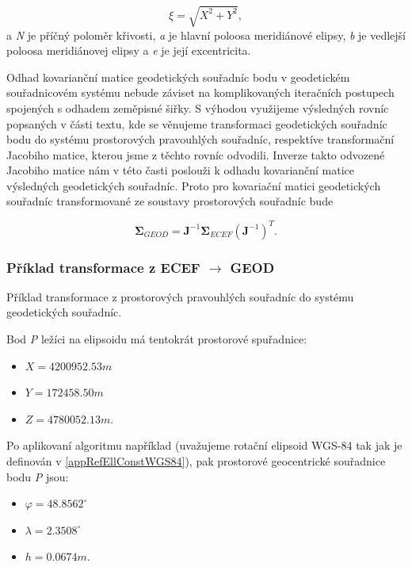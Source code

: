\documentclass[11pt,a4paper]{article}
\begin{document}
\begin{equation}
\xi = \sqrt{X^{2} + Y^{2}}, 
\end{equation}
a \textit{N} je příčný poloměr křivosti, \textit{a} je hlavní poloosa meridiánové elipsy, \textit{b} je vedlejší poloosa meridiánovej elipsy a \textit{e} je její excentricita.

Odhad kovarianční matice geodetických souřadníc bodu v geodetickém souřadnicovém systému nebude záviset na komplikovaných iteračních postupech spojených s odhadem zeměpisné šiřky. S výhodou využijeme výsledných rovníc popsaných v části textu, kde se věnujeme transformaci geodetických souřadníc bodu do systému prostorových pravouhlých souřadníc, respektíve transformační Jacobiho matice, kterou jsme z těchto rovníc odvodili. Inverze takto odvozené Jacobiho matice nám v této časti poslouži k odhadu kovarianční matice výsledných geodetických souřadníc. Proto pro kovariační matici geodetických souřadníc transformované ze soustavy prostorových souřadníc bude

\begin{equation}
\mathbf{\Sigma}_{GEOD} = \mathbf{J}^{-1}\mathbf{\Sigma}_{ECEF}\left(\mathbf{J}^{-1}\right)^{T}.
\end{equation}

\subsubsection{Příklad transformace z ECEF $\rightarrow$ GEOD}

Příklad transformace z prostorových pravouhlých souřadníc do systému geodetických souřadníc.

Bod \textit{P} ležíci na elipsoidu má tentokrát prostorové  spuřadnice:
\begin{itemize}
\item $X = 4200952.53 m$
\item $Y = 172458.50 m$
\item $Z = 4780052.13 m.$
\end{itemize}

Po aplikovaní algoritmu například \cite{Vermeille2011} (uvažujeme rotační elipsoid WGS-84 tak jak je definován v \ref{appRefEllConstWGS84}), pak prostorové geocentrické souřadnice bodu \textit{P} jsou:
\begin{itemize}
\item $\varphi = 48.8562^{\circ}$
\item $\lambda = 2.3508^{\circ}$
\item $h = 0.0674 m.$
\end{itemize}
\end{document}

